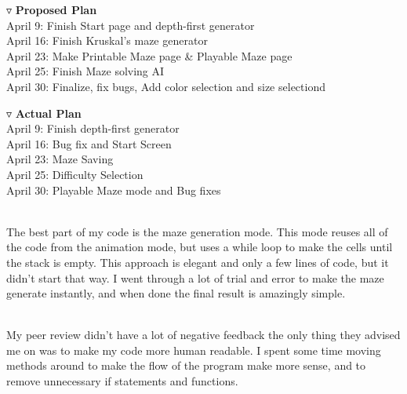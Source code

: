 \documentclass[12 pt]{article}
\renewcommand{\section}[1]{\bigskip \par \noindent {$\blacktriangledown$ \large \bf #1} \\[2ex] \hspace*{0.75cm}}
\renewcommand{\subsection}[1]{\medskip \par {$\triangledown$ \bf #1} \\[1ex] \hspace*{1cm}}
\begin{document}
\subsection{Proposed Plan}
\noindent\hspace*{0.9cm} April 9: Finish Start page and depth-first generator\\
\hspace*{2cm} April 16: Finish Kruskal's maze generator\\
\hspace*{2cm} April 23: Make Printable Maze page \& Playable Maze page\\
\hspace*{2cm} April 25: Finish Maze solving AI\\
\hspace*{2cm} April 30: Finalize, fix bugs, Add color selection and size selectiond
\subsection{Actual Plan}
\noindent\hspace*{0.9cm} April 9: Finish depth-first generator\\
\hspace*{2cm} April 16: Bug fix and Start Screen\\
\hspace*{2cm} April 23: Maze Saving\\
\hspace*{2cm} April 25: Difficulty Selection\\
\hspace*{2cm} April 30: Playable Maze mode and Bug fixes\\
\section{Best Part}
The best part of my code is the maze generation mode. This mode reuses all of the code from the animation mode, but uses a while loop to make the cells until the stack is empty. This approach is elegant and only a few lines of code, but it didn't start that way. I went through a lot of trial and error to make the maze generate instantly, and when done the final result is amazingly simple.
\section{Peer Review Input}
My peer review didn't have a lot of negative feedback the only thing they advised me on was to make my code more human readable. I spent some time moving methods around to make the flow of the program make more sense, and to remove unnecessary if statements and functions. 
\end{document}
